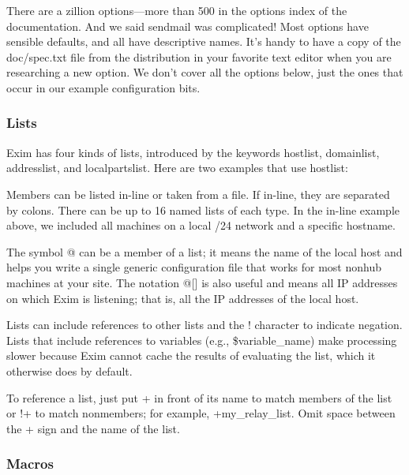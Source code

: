 There are a zillion options---more than 500 in the options index of the
documentation. And we said {sendmail} was complicated! Most options have
sensible defaults, and all have descriptive names. It's handy to have a
copy of the {doc/spec.txt} file from the distribution in your favorite
text editor when you are researching a new option. We don't cover all
the options below, just the ones that occur in our example configuration
bits.

\subsubsection[Lists]{\texorpdfstring{\protect\hypertarget{part0026_split_046.htmlux5cux23_idTextAnchor1138}{}{}Lists}{Lists}}

\protect\hypertarget{part0026_split_046.htmlux5cux23_idIndexMarker2645}{}{}Exim
has four kinds of lists, introduced by the keywords {hostlist},
{domainlist}, {addresslist}, and {localpartslist}. Here are two examples
that use {hostlist}:


Members can be listed in-line or taken from a file. If in-line, they are
separated by colons. There can be up to 16 named lists of each type. In
the in-line example above, we included all machines on a local /24
network and a specific hostname.

The symbol {@} can be a member of a list; it means the name of the local
host and helps you write a single generic configuration file that works
for most nonhub machines at your site. The notation {@{[}{]}} is also
useful and means all IP addresses on which Exim is listening; that is,
all the IP addresses of the local host.

Lists can include references to other lists and the {!} character to
indicate negation. Lists that include references to variables (e.g.,
{\$variable\_name}) make processing slower because Exim cannot cache the
results of evaluating the list, which it otherwise does by default.

To reference a list, just put {+} in front of its name to match members
of the list or {!+} to match nonmembers; for example,
{+my\_relay\_list}. Omit space between the {+} sign and the name of the
list.

\subsubsection[Macros]{\texorpdfstring{\protect\hypertarget{part0026_split_046.htmlux5cux23_idTextAnchor1139}{}{}Macros}{Macros}}

